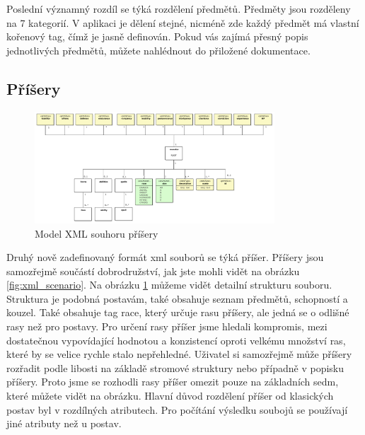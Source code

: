 \documentclass[thesis=B,czech]{resources/FITthesis}[2012/06/26]
\begin{document}
Poslední významný rozdíl se týká rozdělení předmětů. Předměty jsou rozděleny na 7 kategorií. V aplikaci je dělení stejné, nicméně zde každý předmět má vlastní kořenový tag, čímž je jasně definován. Pokud vás zajímá přesný popis jednotlivých předmětů, můžete nahlédnout do přiložené dokumentace. \\

\subsection{Příšery}
\begin{figure}\centering
	\includegraphics[width=0.8\textwidth]{images/monsterXML}
	\caption[Model XML souhoru příšery]{Model XML souhoru příšery}\label{fig:xml_monster}
\end{figure}
Druhý nově zadefinovaný formát xml souborů se týká příšer. Příšery jsou samozřejmě součástí dobrodružství, jak jste mohli vidět na obrázku \ref{fig:xml_scenario}. Na obrázku \ref{fig:xml_monster} můžeme vidět detailní strukturu souboru. Struktura je podobná postavám, také obsahuje seznam předmětů, schopností a kouzel. Také obsahuje tag race, který určuje rasu příšery, ale jedná se o odlišné rasy než pro postavy. Pro určení rasy příšer jsme hledali kompromis, mezi dostatečnou vypovídající hodnotou a konzistencí oproti velkému množství ras, které by se velice rychle stalo nepřehledné. Uživatel si samozřejmě může příšery rozřadit podle libosti na základě stromové struktury nebo případně v popisku příšery. Proto jsme se rozhodli rasy příšer omezit pouze na základních sedm, které můžete vidět na obrázku. Hlavní důvod rozdělení příšer od klasických postav byl v rozdílných atributech. Pro počítání výsledku soubojů se používají jiné atributy než u postav. 
\end{document}
